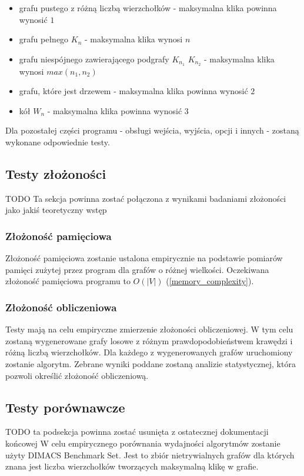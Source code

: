 \documentclass[12pt, a4paper]{article}
\begin{document}
\begin{itemize}
\item grafu pustego z różną liczbą wierzchołków - maksymalna klika powinna wynosić $1$
\item grafu pełnego $K_{n}$ - maksymalna klika wynosi $n$
\item grafu niespójnego zawierającego podgrafy $K_{n_{1}}$ $K_{n_{2}}$ - maksymalna klika wynosi $max(n_{1}, n_{2})$
\item grafu, które jest drzewem - maksymalna klika powinna wynosić $2$
\item kół $W_{n}$ - maksymalna klika powinna wynosić $3$
\end{itemize}

Dla pozostałej części programu - obsługi wejścia, wyjścia, opcji i innych - zostaną wykonane odpowiednie testy.

\subsection{Testy złożoności}
TODO Ta sekcja powinna zostać połączona z wynikami badaniami złożoności jako jakiś teoretyczny wstęp
\subsubsection{Złożoność pamięciowa}
Złożoność pamięciowa zostanie ustalona empirycznie na podstawie pomiarów pamięci zużytej przez program dla grafów o różnej wielkości. Oczekiwana złożoność pamięciowa programu to $O(|V|)$ (\ref{memory_complexity}). 

\subsubsection{Złożoność obliczeniowa}
Testy mają na celu empiryczne zmierzenie złożoności obliczeniowej. W tym celu zostaną wygenerowane grafy losowe z różnym prawdopodobieństwem krawędzi i różną liczbą wierzchołków. Dla każdego z wygenerowanych grafów uruchomiony zostanie algorytm. Zebrane wyniki poddane zostaną analizie statystycznej, która pozwoli określić złożoność obliczeniową.



\subsection{Testy porównawcze}
TODO ta podsekcja powinna zostać usunięta z ostatecznej dokumentacji końcowej
W celu empirycznego porównania wydajności algorytmów zostanie użyty DIMACS Benchmark Set\citep{dimacs}. Jest to zbiór nietrywialnych grafów 
dla których znana jest liczba wierzchołków tworzących maksymalną klikę w grafie.
\end{document}
